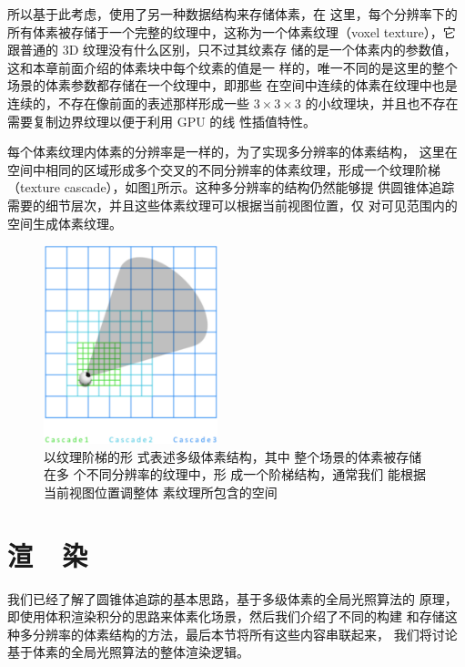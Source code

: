 所以基于此考虑，\cite{a:TheTechnologyofTheTomorrowChildren}使用了另一种数据结构来存储体素，在 这里，每个分辨率下的所有体素被存储于一个完整的纹理中，这称为一个体素纹理（voxel texture），它跟普通的 3D 纹理没有什么区别，只不过其纹素存 储的是一个体素内的参数值，这和本章前面介绍的体素块中每个纹素的值是一 样的，唯一不同的是这里的整个场景的体素参数都存储在一个纹理中，即那些 在空间中连续的体素在纹理中也是连续的，不存在像前面的表述那样形成一些 $3\times  3\times  3$ 的小纹理块，并且也不存在需要复制边界纹理以便于利用 GPU 的线 性插值特性。

每个体素纹理内体素的分辨率是一样的，为了实现多分辨率的体素结构， 这里在空间中相同的区域形成多个交叉的不同分辨率的体素纹理，形成一个纹理阶梯（texture cascade），如图\ref{f:vct-texture-cascaded}所示。这种多分辨率的结构仍然能够提 供圆锥体追踪需要的细节层次，并且这些体素纹理可以根据当前视图位置，仅 对可见范围内的空间生成体素纹理。

\begin{figure}
	\sidecaption
	\includegraphics[width=0.45\textwidth]{figures/vct/texture-cascaded}
	\caption{以纹理阶梯的形 式表述多级体素结构，其中 整个场景的体素被存储在多 个不同分辨率的纹理中，形 成一个阶梯结构，通常我们 能根据当前视图位置调整体 素纹理所包含的空间}
	\label{f:vct-texture-cascaded}
\end{figure}




\section{渲~~染}\label{sec:vct-rendering}
我们已经了解了圆锥体追踪的基本思路，基于多级体素的全局光照算法的 原理，即使用体积渲染积分的思路来体素化场景，然后我们介绍了不同的构建 和存储这种多分辨率的体素结构的方法，最后本节将所有这些内容串联起来， 我们将讨论基于体素的全局光照算法的整体渲染逻辑。

